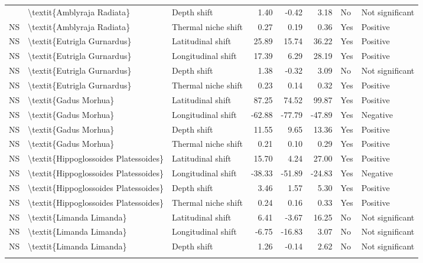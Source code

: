 \begin{longtable}[t]{lllrrrll}
{{\addlinespace
NS & \textbackslash{}textit\{Amblyraja Radiata\} & Depth shift & 1.40 & -0.42 & 3.18 & No & Not significant\\
NS & \textbackslash{}textit\{Amblyraja Radiata\} & Thermal niche shift & 0.27 & 0.19 & 0.36 & Yes & Positive\\
NS & \textbackslash{}textit\{Eutrigla Gurnardus\} & Latitudinal shift & 25.89 & 15.74 & 36.22 & Yes & Positive\\
NS & \textbackslash{}textit\{Eutrigla Gurnardus\} & Longitudinal shift & 17.39 & 6.29 & 28.19 & Yes & Positive\\
NS & \textbackslash{}textit\{Eutrigla Gurnardus\} & Depth shift & 1.38 & -0.32 & 3.09 & No & Not significant\\
\addlinespace
NS & \textbackslash{}textit\{Eutrigla Gurnardus\} & Thermal niche shift & 0.23 & 0.14 & 0.32 & Yes & Positive\\
NS & \textbackslash{}textit\{Gadus Morhua\} & Latitudinal shift & 87.25 & 74.52 & 99.87 & Yes & Positive\\
NS & \textbackslash{}textit\{Gadus Morhua\} & Longitudinal shift & -62.88 & -77.79 & -47.89 & Yes & Negative\\
NS & \textbackslash{}textit\{Gadus Morhua\} & Depth shift & 11.55 & 9.65 & 13.36 & Yes & Positive\\
NS & \textbackslash{}textit\{Gadus Morhua\} & Thermal niche shift & 0.21 & 0.10 & 0.29 & Yes & Positive\\
\addlinespace
NS & \textbackslash{}textit\{Hippoglossoides Platessoides\} & Latitudinal shift & 15.70 & 4.24 & 27.00 & Yes & Positive\\
NS & \textbackslash{}textit\{Hippoglossoides Platessoides\} & Longitudinal shift & -38.33 & -51.89 & -24.83 & Yes & Negative\\
NS & \textbackslash{}textit\{Hippoglossoides Platessoides\} & Depth shift & 3.46 & 1.57 & 5.30 & Yes & Positive\\
NS & \textbackslash{}textit\{Hippoglossoides Platessoides\} & Thermal niche shift & 0.24 & 0.16 & 0.33 & Yes & Positive\\
NS & \textbackslash{}textit\{Limanda Limanda\} & Latitudinal shift & 6.41 & -3.67 & 16.25 & No & Not significant\\
\addlinespace
NS & \textbackslash{}textit\{Limanda Limanda\} & Longitudinal shift & -6.75 & -16.83 & 3.07 & No & Not significant\\
NS & \textbackslash{}textit\{Limanda Limanda\} & Depth shift & 1.26 & -0.14 & 2.62 & No & Not significant\\
}}
\end{longtable}
